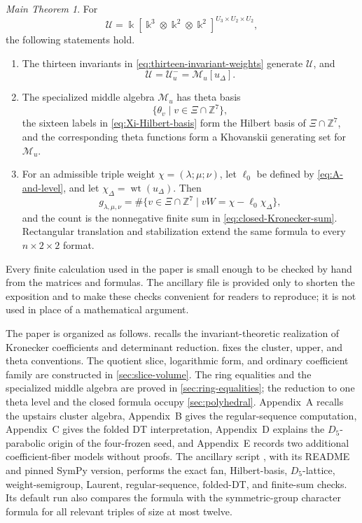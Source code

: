 \documentclass[11pt,reqno]{amsart}
\numberwithin{equation}{section}
\theoremstyle{remark}
\newtheorem*{maintheorem}{Main Theorem}
\newcommand{\kk}{\Bbbk}
\newcommand{\ZZ}{\mathbb{Z}}
\newcommand{\UR}{\mathscr U}
\newcommand{\Uneg}{\mathcal U_u^{-}}
\newcommand{\Mu}{\mathcal M_u}
\newcommand{\udisc}{u_{\Delta}}
\newcommand{\wt}{\operatorname{wt}}
\begin{document}
\begin{maintheorem}
For
\[ \UR=\kk[\kk^3\otimes\kk^2\otimes\kk^2]^{U_3\times U_2\times U_2}, \]
the following statements hold.
\begin{enumerate}
\item The thirteen invariants in \eqref{eq:thirteen-invariant-weights}
generate $\UR$, and
\[ \UR=\Uneg=\Mu[\udisc]. \]
\item The specialized middle algebra $\Mu$ has theta basis
\[ \{\theta_v\mid v\in\Xi\cap\ZZ^7\}, \]
the sixteen labels in \eqref{eq:Xi-Hilbert-basis} form the Hilbert
basis of $\Xi\cap\ZZ^7$, and the corresponding theta functions form a Khovanskii generating set for $\Mu$.
\item For an admissible triple weight
$\chi=(\lambda;\mu;\nu)$, let $\ell_0$ be defined by
\eqref{eq:A-and-level}, and let
$\chi_\Delta=\wt(\udisc)$.  Then
\[ g_{\lambda,\mu,\nu} =\#\{v\in\Xi\cap\ZZ^7\mid vW=\chi-\ell_0\chi_\Delta\}, \]
and the count is the nonnegative finite sum in
\eqref{eq:closed-Kronecker-sum}.  Rectangular translation and stabilization
extend the same formula to every $n\times2\times2$ format.
\end{enumerate}
\end{maintheorem}

Every finite calculation used in the paper is small enough to be checked by
hand from the matrices and formulas.  The ancillary file
 is provided only to shorten the exposition and to make these
checks convenient for readers to reproduce; it is not used in place of a
mathematical argument.

The paper is organized as follows.   recalls the
invariant-theoretic realization of Kronecker coefficients and determinant
reduction.   fixes the cluster, upper, and theta
conventions.  The quotient slice, logarithmic form, and ordinary coefficient
family are constructed in \cref{sec:slice-volume}.  The ring equalities and
the specialized middle algebra are proved in \cref{sec:ring-equalities}; the
reduction to one theta level and the closed formula occupy
\cref{sec:polyhedral}.  Appendix~A recalls the upstairs cluster algebra,
Appendix~B gives the regular-sequence computation, Appendix~C gives the folded
DT interpretation, Appendix~D explains the $D_5$-parabolic origin of the
four-frozen seed, and Appendix~E records two additional coefficient-fiber
models without proofs.  The ancillary script
, with its README and pinned SymPy version,
performs the exact fan, Hilbert-basis, $D_5$-lattice, weight-semigroup,
Laurent, regular-sequence, folded-DT, and finite-sum checks.  Its default run
also compares the
formula with the symmetric-group character formula for all relevant triples
of size at most twelve.
\end{document}
